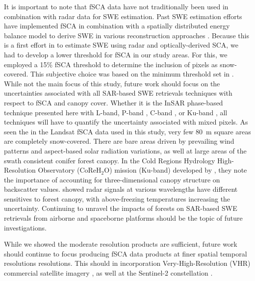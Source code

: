 It is important to note that fSCA data have not traditionally been used in combination with radar data for SWE estimation. Past SWE estimation efforts have implemented fSCA in combination with a spatially distributed energy balance model to derive SWE in various reconstruction approaches \citep{clineEstimatingSpatialDistribution1998,molotchEstimatingDistributionSnow2008,rittgerSpatialEstimatesSnow2016,margulisLandsatEraSierraNevada2016}. Because this is a first effort in to estimate SWE using radar and optically-derived SCA, we had to develop a lower threshold for fSCA in our study areas. For this, we employed a 15\% fSCA threshold to determine the inclusion of pixels as snow-covered. This subjective choice was based on the minimum threshold set in \cite{painterRetrievalSubpixelSnow2009}. While not the main focus of this study, future work should focus on the uncertainties associated with all SAR-based SWE retrievals techniques with respect to fSCA and canopy cover. Whether it is the InSAR phase-based technique presented here with L-band, P-band \citep{shahRemoteSensingSnow2017,maEstimatingSpatiotemporallyContinuous2023}, C-band \citep{lievensSnowDepthVariability2019,oveisgharanSnowWaterEquivalent2023}, or Ku-band \citep{tsangReviewArticleGlobal2022,rottColdRegionsHydrology2010}, all techniques will have to quantify the uncertainty associated with mixed pixels. As seen the in the Landsat fSCA data used in this study, very few 80~m square areas are completely snow-covered. There are bare areas driven by prevailing wind patterns and aspect-based solar radiation variations, as well at large areas of the swath consistent conifer forest canopy. In the Cold Regions Hydrology High-Resolution Observatory (CoReH$_{2}$O) mission (Ku-band) developed by \cite{rottColdRegionsHydrology2010}, they note the importance of accounting for three-dimensional canopy structure on backscatter values. \cite{lemmetyinenAttenuationRadarSignal2022} showed radar signals at various wavelengths have different sensitives to forest canopy, with above-freezing temperatures increasing the uncertainty. Continuing to unravel the impacts of forests on SAR-based SWE retrievals from airborne and spaceborne platforms should be the topic of future investigations.

While we showed the moderate resolution products are sufficient, future work should continue to focus producing fSCA data products at finer spatial temporal resolutions resolutions. This should in incorporation Very-High-Resolution (VHR) commercial satellite imagery \citep{huImprovingMountainSnow2022, thalerEstimatingSnowCover2023,yangHighresolutionMappingSnow2023,johnHighResolutionSnowCoveredArea2022}, as well at the Sentinel-2 constellation \citep{gascoinEstimatingFractionalSnow2020}.

